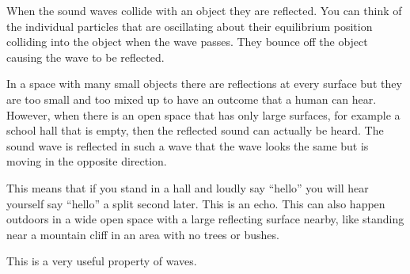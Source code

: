 When the sound waves collide with an object they are reflected. You can think of the individual particles that are oscillating about their equilibrium position colliding into the object when the wave passes. They bounce off the object causing the wave to be reflected.

In a space with many small objects there are reflections at every surface but they are too small and too mixed up to have an outcome that a human can hear. However, when there is an open space that has only large surfaces, for example a school hall that is empty, then the reflected sound can actually be heard. The sound wave is reflected in such a wave that the wave looks the same but is moving in the opposite direction.

This means that if you stand in a hall and loudly say ``hello'' you will hear yourself say ``hello'' a split second later. This is an echo. This can also happen outdoors in a wide open space with a large reflecting surface nearby, like standing near a mountain cliff in an area with no trees or bushes.

This is a very useful property of waves.

